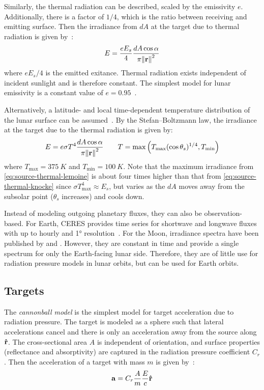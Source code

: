 \documentclass[parskip=full,DIV=15]{scrartcl}
\begin{document}
Similarly, the thermal radiation can be described, scaled by the emissivity $e$. Additionally, there is a factor of $1/4$, which is the ratio between receiving and emitting surface. Then the irradiance from $dA$ at the target due to thermal radiation is given by~\cite{Knocke1988}:
\begin{align}\label{eq:source-thermal-knocke}
   E = \frac{e E_s}{4} \frac{dA\cos\alpha}{\pi \norm{\vb r}^2}
\end{align}
where $e E_s/4$ is the emitted exitance. Thermal radiation exists independent of incident sunlight and is therefore constant. The simplest model for lunar emissivity is a constant value of $e=0.95$~\cite{Mueller2021}.

Alternatively, a latitude- and local time-dependent temperature distribution of the lunar surface can be assumed~\cite{Lemoine2013}. By the Stefan--Boltzmann law, the irradiance at the target due to the thermal radiation is given by:
\begin{align}\label{eq:source-thermal-lemoine}
   E = e\sigma T^4 \frac{dA\cos\alpha}{\pi \norm{\vb r}^2}
   \qquad
   T = \max\left(T_\text{max}(\cos\theta_s)^{1/4}, T_\text{min}\right)
\end{align}
where $T_\text{max}=\SI{375}{K}$ and $T_\text{min}=\SI{100}{K}$. Note that the maximum irradiance from \cref{eq:source-thermal-lemoine} is about four times higher than that from \cref{eq:source-thermal-knocke} since $\sigma T_\text{max}^4 \approx E_s$, but varies as the $dA$ moves away from the subsolar point ($\theta_s$ increases) and cools down.

Instead of modeling outgoing planetary fluxes, they can also be observation-based. For Earth, CERES provides time series for shortwave and longwave fluxes with up to hourly and \ang{1} resolution~\cite[]{Doelling2016}. For the Moon, irradiance spectra have been published by \textcite{Kieffer2005} and \textcite{Sun2021}. However, they are constant in time and provide a single spectrum for only the Earth-facing lunar side. Therefore, they are of little use for radiation pressure models in lunar orbits, but can be used for Earth orbits.



\subsection{Targets}
The \emph{cannonball model} is the simplest model for target acceleration due to radiation pressure. The target is modeled as a sphere such that lateral accelerations cancel and there is only an acceleration away from the source along $\vu r$. The cross-sectional area $A$ is independent of orientation, and surface properties (reflectance and absorptivity) are captured in the radiation pressure coefficient $C_r$. Then the acceleration of a target with mass $m$ is given by~\cite{Knocke1988}:
\begin{align}
   \vb a = C_r \frac{A}{m} \frac{E}{c} \vu r
\end{align}
\end{document}
